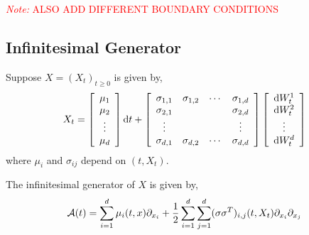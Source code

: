 \documentclass[12pt]{article}
\newcommand{\note}[1]{\textcolor{red}{\textit{Note:} #1}}
\begin{document}
\note{ALSO ADD DIFFERENT BOUNDARY CONDITIONS}

\subsection{Infinitesimal Generator}
\label{sec:infgen}
Suppose \( X = (X_t)_{t\geq 0} \) is given by,
\begin{align*}
    X_t = \left[\begin{array}{c}\mu_1 \\ \mu_2 \\ \vdots \\ \mu_d \end{array}\right] \mathrm{d} t + \left[\begin{array}{cccc}\sigma_{1,1} & \sigma_{1,2} & \cdots & \sigma_{1,d} \\
        \sigma_{2,1} & & & \sigma_{2,d} \\
        \vdots & & & \vdots \\
        \sigma_{d,1} & \sigma_{d,2} & \cdots & \sigma_{d,d}
\end{array}\right]
\left[\begin{array}{c}\mathrm{d} W_t^1 \\ \mathrm{d} W_t^2 \\ \vdots \\ \mathrm{d} W_t^d\end{array}\right]
\end{align*}
where \( \mu_i \) and \( \sigma_{ij} \) depend on \( (t,X_t) \).

The infinitesimal generator of \( X \) is given by,
\begin{align*}
    \mathcal{A}(t) = \sum_{i=1}^{d}\mu_i(t,x)\partial_{x_i} + \frac{1}{2} \sum_{i=1}^{d}\sum_{j=1}^{d} (\sigma\sigma^T)_{i,j}(t,X_t)\partial_{x_i} \partial_{x_j}
\end{align*}

\iffalse
In the 2d case,
\begin{align*}
    \sigma \sigma^T = \left[\begin{array}{cc} 
        \sigma_{1,1}^2+\sigma_{1,2}^2 & \sigma_{1,1}\sigma_{2,1} + \sigma_{1,2}\sigma_{2,2} \\
        \sigma_{1,1}\sigma_{2,1}+\sigma_{1,2}\sigma_{2,2} & \sigma_{2,1}^2 + \sigma_{2,2}^2
    \end{array}\right]
\end{align*}
\fi
\end{document}
